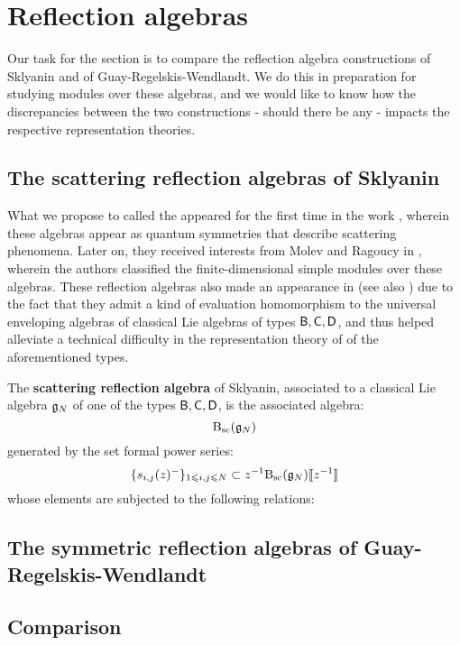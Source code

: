 \section{Reflection algebras}
    Our task for the section is to compare the reflection algebra constructions of Sklyanin and of Guay-Regelskis-Wendlandt. We do this in preparation for studying modules over these algebras, and we would like to know how the discrepancies between the two constructions - should there be any - impacts the respective representation theories.

    \subsection{The scattering reflection algebras of Sklyanin}
        What we propose to called the   appeared for the first time in the work \cite{sklyanin_boundary_conditions_for_integrable_quantum_systems}, wherein these algebras appear as quantum symmetries that describe scattering phenomena. Later on, they received interests from Molev and Ragoucy in \cite{molev_ragoucy_representations_of_reflection_algebras}, wherein the authors classified the finite-dimensional simple modules over these algebras. These reflection algebras also made an appearance in \cite{isaev_molev_ogievetsky_fusion_for_brauer_algebras_2} (see also \cite{isaev_molev_fusion_for_brauer_algebras_1}) due to the fact that they admit a kind of evaluation homomorphism to the universal enveloping algebras of classical Lie algebras of types $\mathsf{B}, \mathsf{C}, \mathsf{D}$, and thus helped alleviate a technical difficulty in the representation theory of  of the aforementioned types.

        \begin{definition} \label{def: scatteering_reflection_algebras}
            The \textbf{scattering reflection algebra} of Sklyanin, associated to a classical Lie algebra $\mathfrak{g}_N$ of one of the types $\mathsf{B}, \mathsf{C}, \mathsf{D}$, is the associated algebra:
                $$\mathrm{B_{sc}}(\mathfrak{g}_N)$$
            generated by the set formal power series:
                $$\{ s_{i, j}(z)^- \}_{1 \leqslant i, j \leqslant N} \subset z^{-1}\mathrm{B_{sc}}(\mathfrak{g}_N)[\![z^{-1}]\!]$$
            whose elements are subjected to the following relations:
                
        \end{definition}

    \subsection{The symmetric reflection algebras of Guay-Regelskis-Wendlandt}

    \subsection{Comparison}